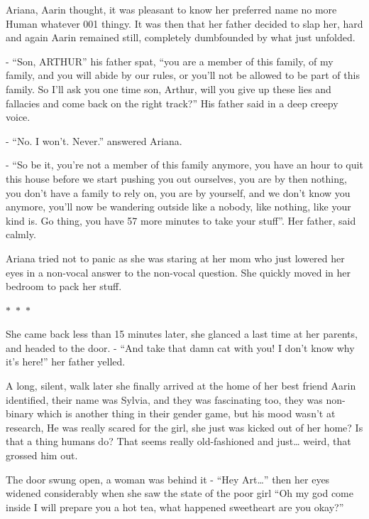 \documentclass[colorlinks,12pt,a4paper]{book}
\newcommand\sep{\begin{center}
  \boldmath $\ast$~$\ast$~$\ast$
\end{center}}
\begin{document}
Ariana, Aarin thought, it was pleasant to know her preferred name no more Human whatever 001 thingy.\newline
It was then that her father decided to slap her, hard and again Aarin remained still, 
completely dumbfounded by what just unfolded.\par
\bigskip

- “Son, ARTHUR” his father spat, “you are a member of this family, of my family, and you will abide by our rules,
or you'll not be allowed to be part of this family. So I'll ask you one time son, Arthur, 
will you give up these lies and fallacies and come back on the right track?” His father said in a deep creepy voice.\newline

- “No. I won't. Never.” answered Ariana.\newline

- “So be it, you're not a member of this family anymore, you have an hour 
to quit this house before we start pushing you out ourselves, you are by then nothing, 
you don't have a family to rely on, you are by yourself, and we don't know you anymore, 
you'll now be wandering outside like a nobody, like nothing, like your kind is. Go thing, 
you have 57 more minutes to take your stuff”. Her father, said calmly.\par
\bigskip

Ariana tried not to panic as she was staring at her mom who just lowered her eyes in a 
non-vocal answer to the non-vocal question. She quickly moved in her bedroom to pack her stuff.

\sep 

She came back less than 15 minutes later, she glanced a last time at her parents, and headed to the door.\newline
- “And take that damn cat with you! I don't know why it's here!” her father yelled.\par
\bigskip

A long, silent, walk later she finally arrived at the home of her best friend Aarin identified, 
their name was Sylvia, and they was fascinating too, they was non-binary which is another thing in their 
gender game, but his mood wasn't at research, He was really scared for the girl, she just was kicked out of
 her home? Is that a thing humans do? That seems really old-fashioned and just… weird, that grossed him out.\par
 \bigskip

The door swung open, a woman was behind it\newline
- “Hey Art…” then her eyes widened considerably when she saw the state of the poor girl 
“Oh my god come inside I will prepare you a hot tea, what happened sweetheart are you okay?”\par
\bigskip
\end{document}
